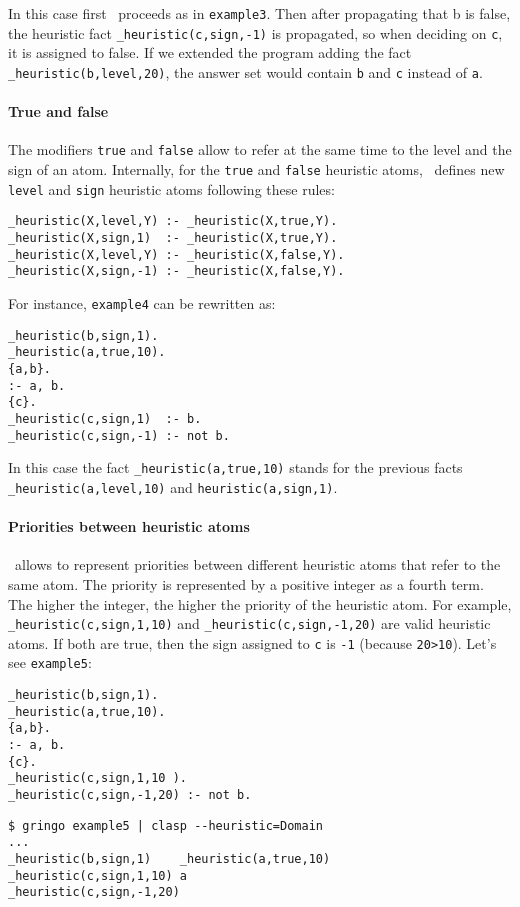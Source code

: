In this case first \clasp\ proceeds as in \texttt{example3}.
Then after propagating that b is false,  the heuristic fact \texttt{\_heuristic(c,sign,-1)} is propagated,
so when deciding on \texttt{c}, it is assigned to false.  If we extended the program adding the fact \texttt{\_heuristic(b,level,20)},
the answer set would contain \texttt{b} and \texttt{c} instead of \texttt{a}.

\paragraph{True and false}

 The modifiers \texttt{true} and \texttt{false} allow to refer at the same time to the level and the sign of an atom.
 Internally,  for the \texttt{true} and \texttt{false} heuristic atoms,
 \clasp\ defines new \texttt{level} and \texttt{sign} heuristic atoms following these rules:
\begin{lstlisting}[numbers=none]
_heuristic(X,level,Y) :- _heuristic(X,true,Y).
_heuristic(X,sign,1)  :- _heuristic(X,true,Y).
_heuristic(X,level,Y) :- _heuristic(X,false,Y).
_heuristic(X,sign,-1) :- _heuristic(X,false,Y).
\end{lstlisting}

For instance, \texttt{example4} can be rewritten as:
\begin{lstlisting}[numbers=none]
_heuristic(b,sign,1).
_heuristic(a,true,10).
{a,b}.
:- a, b.
{c}.
_heuristic(c,sign,1)  :- b.
_heuristic(c,sign,-1) :- not b.
\end{lstlisting}

In this case the fact \texttt{\_heuristic(a,true,10)} stands for the previous
facts \texttt{\_heuristic(a,level,10)} and \texttt{heuristic(a,sign,1)}.

\paragraph{Priorities between heuristic atoms}

\clasp\ allows to represent priorities between different heuristic atoms that refer to the same atom.
The priority is represented by a positive integer as a fourth term.
The higher the integer, the higher the priority of the heuristic atom.
For example, \texttt{\_heuristic(c,sign,1,10)} and \texttt{\_heuristic(c,sign,-1,20)} are valid heuristic atoms.
If both are true, then the sign assigned to \texttt{c} is \texttt{-1} (because \texttt{20>10}).  Let's see \texttt{example5}:
\begin{lstlisting}[numbers=none]
_heuristic(b,sign,1).
_heuristic(a,true,10).
{a,b}.
:- a, b.
{c}.
_heuristic(c,sign,1,10 ).
_heuristic(c,sign,-1,20) :- not b.
\end{lstlisting}
\begin{lstlisting}[numbers=none]
$ gringo example5 | clasp --heuristic=Domain
...
_heuristic(b,sign,1)    _heuristic(a,true,10)
_heuristic(c,sign,1,10) a
_heuristic(c,sign,-1,20)\end{lstlisting}

